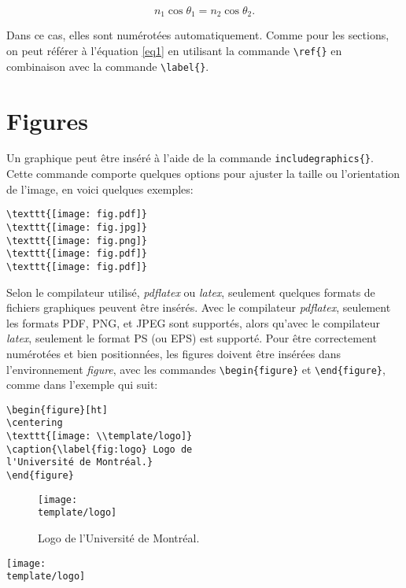 \documentclass[10pt,letterpaper,twocolumn]{article}
\newcommand{\template}{/home/eric/UdeM/session_5/Lab3/template}
\begin{document}
\begin{equation}\label{eq1}
n_1 \cos{\theta_1}=n_2 \cos{\theta_2}.
\end{equation}

\noindent Dans ce cas, elles sont numérotées automatiquement. Comme pour les sections, on peut référer à l'équation \ref{eq1} en utilisant la commande \verb|\ref{}| en combinaison avec la commande \verb|\label{}|.

\section{Figures}

Un graphique peut être inséré à l'aide de la commande \verb+includegraphics{}+. Cette commande comporte quelques options pour ajuster la taille ou l'orientation de l'image, en voici quelques exemples:
\begin{verbatim}
\texttt{[image: fig.pdf]}
\texttt{[image: fig.jpg]}
\texttt{[image: fig.png]}
\texttt{[image: fig.pdf]}
\texttt{[image: fig.pdf]}
\end{verbatim}

Selon le compilateur utilisé, {\em pdflatex} ou {\em latex}, seulement quelques formats de fichiers graphiques peuvent être insérés. Avec le compilateur {\em pdflatex}, seulement les formats PDF, PNG, et JPEG sont supportés, alors qu'avec le compilateur {\em latex}, seulement le format PS (ou EPS) est supporté. Pour être correctement numérotées et bien positionnées, les figures doivent être insérées dans l'environnement {\em figure}, avec les commandes \verb+\begin{figure}+ et \verb+\end{figure}+, comme dans l'exemple qui suit:
\begin{verbatim}
\begin{figure}[ht]
\centering
\texttt{[image: \\template/logo]}
\caption{\label{fig:logo} Logo de 
l'Université de Montréal.}
\end{figure}
\end{verbatim}

\begin{figure}[ht]
\centering
\texttt{[image: \\template/logo]}
\caption{\label{fig:logo} Logo de l'Université de Montréal.}
\end{figure}

\begin{figure*}[t]
\centering
\texttt{[image: \\template/logo]}
\caption{\label{fig:logo2} Logo de l'Université de Montréal.}
\end{figure*}
\end{document}
